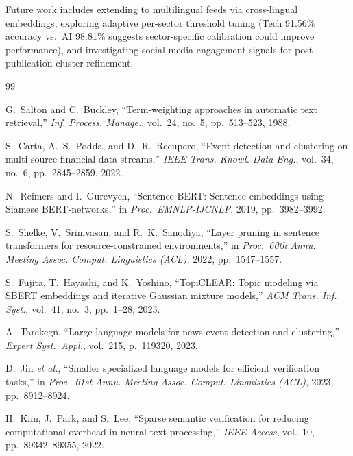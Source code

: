 \documentclass[conference]{IEEEtran}
\begin{document}
Future work includes extending to multilingual feeds via cross-lingual embeddings, exploring adaptive per-sector threshold tuning (Tech 91.56\% accuracy vs.\ AI 98.81\% suggests sector-specific calibration could improve performance), and investigating social media engagement signals for post-publication cluster refinement.

\begin{thebibliography}{99}
\footnotesize
\setlength{\itemsep}{1pt}
\setlength{\parskip}{0pt}

G.~Salton and C.~Buckley, ``Term-weighting approaches in automatic text retrieval,'' \textit{Inf. Process. Manage.}, vol.~24, no.~5, pp.\ 513--523, 1988.

S.~Carta, A.~S.~Podda, and D.~R.~Recupero, ``Event detection and clustering on multi-source financial data streams,'' \textit{IEEE Trans. Knowl. Data Eng.}, vol.~34, no.~6, pp.\ 2845--2859, 2022.

N.~Reimers and I.~Gurevych, ``Sentence-BERT: Sentence embeddings using Siamese BERT-networks,'' in \textit{Proc.\ EMNLP-IJCNLP}, 2019, pp.\ 3982--3992.

S.~Shelke, V.~Srinivasan, and R.~K.~Sanodiya, ``Layer pruning in sentence transformers for resource-constrained environments,'' in \textit{Proc.\ 60th Annu. Meeting Assoc. Comput. Linguistics (ACL)}, 2022, pp.\ 1547--1557.

S.~Fujita, T.~Hayashi, and K.~Yoshino, ``TopiCLEAR: Topic modeling via SBERT embeddings and iterative Gaussian mixture models,'' \textit{ACM Trans. Inf. Syst.}, vol.~41, no.~3, pp.\ 1--28, 2023.

A.~Tarekegn, ``Large language models for news event detection and clustering,'' \textit{Expert Syst.\ Appl.}, vol.~215, p.~119320, 2023.

D.~Jin \textit{et al.}, ``Smaller specialized language models for efficient verification tasks,'' in \textit{Proc.\ 61st Annu. Meeting Assoc. Comput. Linguistics (ACL)}, 2023, pp.\ 8912--8924.

H.~Kim, J.~Park, and S.~Lee, ``Sparse semantic verification for reducing computational overhead in neural text processing,'' \textit{IEEE Access}, vol.~10, pp.\ 89342--89355, 2022.

\end{thebibliography}
\end{document}
